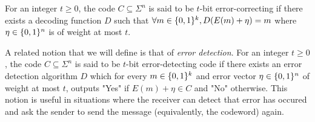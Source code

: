 \begin{definition}
For an integer $t \ge 0$, the code $C \subseteq \Sigma^n$ is said to be $t$-bit error-correcting if there exists a decoding function $D$ such that $\forall m \in \{0,1\}^k, D(E(m)+\eta) = m$ where $\eta \in \{0,1\}^n$ is of weight at most $t$.
\end{definition}

A related notion that we will define is that of \textit{error detection}. %
For an integer $t \ge 0$, the code $C \subseteq \Sigma^n$ is said to be $t$-bit error-detecting code if there exists an error detection algorithm $D$ which for every $m \in \{0,1\}^k$ and error vector $\eta \in \{0,1\}^n$ of weight at most $t$, outputs "{\sc Yes}" if $E(m)+\eta \in C$ and "{\sc No}" otherwise. This notion is useful in situations where the receiver can detect that error has occured and ask the sender to send the message (equivalently, the codeword) again.

